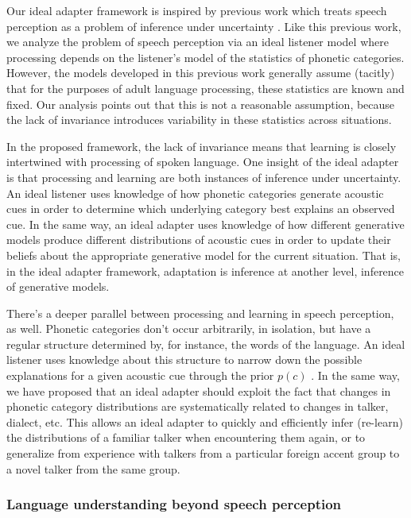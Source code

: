 Our ideal adapter framework is inspired by previous work which treats speech perception as a problem of inference under uncertainty \autocite{Clayards2008,Feldman2009a,Norris2008,Sonderegger2010}.
Like this previous work, we analyze the problem of speech perception via an ideal listener model where processing depends on the listener's model of the statistics of phonetic categories.  However, the models developed in this previous work generally assume (tacitly) that for the purposes of adult language processing, these statistics are known and fixed.
Our analysis points out that this is not a reasonable assumption, because the lack of invariance introduces variability in these statistics across situations.

In the proposed framework, the lack of invariance means that learning is closely intertwined with processing of spoken language.  One insight of the ideal adapter is that processing and learning are both instances of inference under uncertainty.  An ideal listener uses knowledge of how phonetic categories generate acoustic cues in order to determine which underlying category best explains an observed cue.  In the same way, an ideal adapter uses knowledge of how different generative models produce different distributions of acoustic cues in order to update their beliefs about the appropriate generative model for the current situation.  That is, in the ideal adapter framework, adaptation is inference at another level, inference of generative models.

There's a deeper parallel between processing and learning in speech perception, as well.  Phonetic categories don't occur arbitrarily, in isolation, but have a regular structure determined by, for instance, the words of the language.  An ideal listener uses knowledge about this structure to narrow down the possible explanations for a given acoustic cue through the prior $p(c)$ \autocite{Feldman2013b}.  In the same way, we have proposed that an ideal adapter should exploit the fact that changes in phonetic category distributions are systematically related to changes in talker, dialect, etc. This allows an ideal adapter to quickly and efficiently infer (re-learn) the distributions of a familiar talker when encountering them again, or to generalize from experience with talkers from a particular foreign accent group to a novel talker from the same group.

\subsubsection{Language understanding beyond speech perception}
\label{sec:impl-lang-proc}

